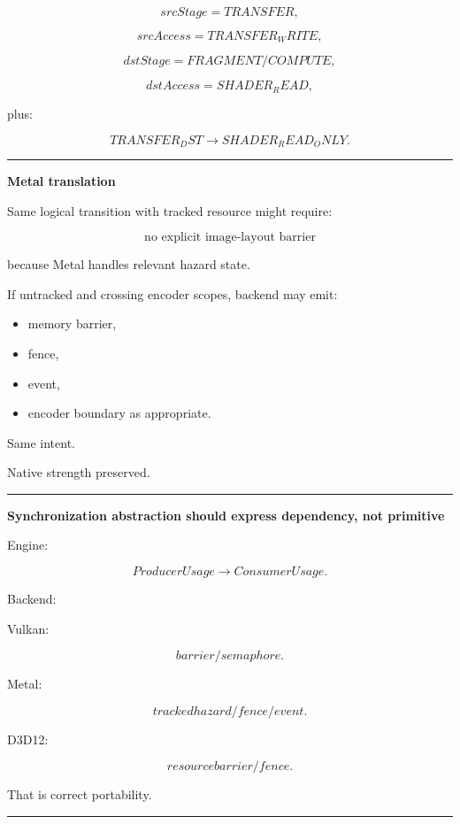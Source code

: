 \[
srcStage=TRANSFER,
\]

\[
srcAccess=TRANSFER_WRITE,
\]

\[
dstStage=FRAGMENT/COMPUTE,
\]

\[
dstAccess=SHADER_READ,
\]

plus:

\[
TRANSFER_DST
\rightarrow
SHADER_READ_ONLY.
\]

\begin{center}\rule{0.5\linewidth}{0.5pt}\end{center}

\textbf{Metal translation}

Same logical transition with tracked resource might require:

\[
\boxed{\text{no explicit image-layout barrier}}
\]

because Metal handles relevant hazard state.

If untracked and crossing encoder scopes, backend may emit:

\begin{itemize}
\tightlist
\item
  memory barrier,
\item
  fence,
\item
  event,
\item
  encoder boundary as appropriate.
\end{itemize}

Same intent.

Native strength preserved.

\begin{center}\rule{0.5\linewidth}{0.5pt}\end{center}

\textbf{Synchronization abstraction should express dependency, not primitive}

Engine:

\[
ProducerUsage
\rightarrow
ConsumerUsage.
\]

Backend:

Vulkan:

\[
barrier/semaphore.
\]

Metal:

\[
tracked hazard/fence/event.
\]

D3D12:

\[
resource barrier/fence.
\]

That is correct portability.

\begin{center}\rule{0.5\linewidth}{0.5pt}\end{center}

